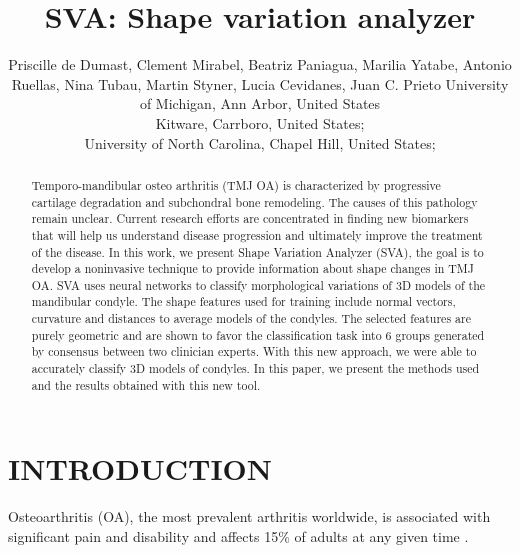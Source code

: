 \documentclass[]{spie}  %
\title{SVA: Shape variation analyzer}
\author{Priscille de Dumast\supit{a}, Clement Mirabel\supit{a}, Beatriz Paniagua\supit{b}, Marilia Yatabe\supit{a}, Antonio Ruellas,\supit{a}
Nina Tubau\supit{a}, Martin Styner\supit{c}, Lucia Cevidanes\supit{a}, Juan C. Prieto\supit{c}
\skiplinehalf
\supit{a}University of Michigan, Ann Arbor, United States \\
\supit{b}Kitware, Carrboro, United States; \\
\supit{c}University of North Carolina, Chapel Hill, United States;
}
\begin{document}
 
  \maketitle 

\begin{abstract}

Temporo-mandibular osteo arthritis (TMJ OA)
is characterized by progressive cartilage degradation and subchondral bone remodeling. The causes of this pathology remain 
unclear. Current research efforts are concentrated in finding new biomarkers
that will help us understand disease progression and ultimately improve the treatment of the disease. 
In this work, we present Shape Variation Analyzer (SVA), the goal is to develop a noninvasive technique to provide information about shape changes in TMJ OA. 
SVA uses neural networks to classify morphological variations of 3D models of the mandibular condyle. 
The shape features used for training include normal vectors, curvature and distances to average models of the condyles. 
The selected features are purely geometric and are shown to favor the classification task into 6 groups 
generated by consensus between two clinician experts. 
With this new approach, we were able to accurately classify 3D models of condyles. 
In this paper, we present the methods used and the results obtained with this new tool. 

\end{abstract}



\section{INTRODUCTION}
\label{sec:intro}  %

Osteoarthritis (OA), the most prevalent arthritis worldwide, is associated with significant pain and disability and affects 15\% of adults at any given time \cite{kalladka2014temporomandibular}. 
\end{document}
